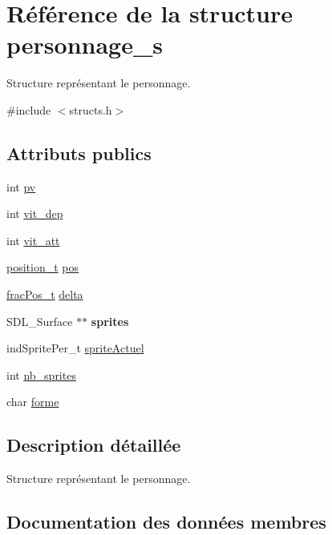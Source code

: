 \hypertarget{structpersonnage__s}{}\section{Référence de la structure personnage\+\_\+s}
\label{structpersonnage__s}


Structure représentant le personnage.  




{\ttfamily \#include $<$structs.\+h$>$}

\subsection*{Attributs publics}
\begin{DoxyCompactItemize}
\item 
int \hyperlink{structpersonnage__s_ab3090d9110756af454516f939e9f8a86}{pv}
\item 
int \hyperlink{structpersonnage__s_a6899a0efdc3a3fccb060aaf06b4e4b8d}{vit\+\_\+dep}
\item 
int \hyperlink{structpersonnage__s_a0022973bab638a02774a19710cedcd17}{vit\+\_\+att}
\item 
\hyperlink{structposition__s}{position\+\_\+t} \hyperlink{structpersonnage__s_adea4789f8b55587ec092f3a32b7b1964}{pos}
\item 
\hyperlink{structfrac_pos__s}{frac\+Pos\+\_\+t} \hyperlink{structpersonnage__s_a396d01ba0660ce2327f65f891d4f239e}{delta}
\item 
\mbox{\label{structpersonnage__s_a8a93d7a1c56bf5d45a13754b8387e27c}} 
S\+D\+L\+\_\+\+Surface $\ast$$\ast$ {\bfseries sprites}
\item 
ind\+Sprite\+Per\+\_\+t \hyperlink{structpersonnage__s_a31cfe3f9dacab7ae783fc557cd0a0adf}{sprite\+Actuel}
\item 
int \hyperlink{structpersonnage__s_aabe3731a1f5bbb6b08c4f9e9d89db0a1}{nb\+\_\+sprites}
\item 
char \hyperlink{structpersonnage__s_a1f1eb200420640259201a84300bccf7e}{forme}
\end{DoxyCompactItemize}


\subsection{Description détaillée}
Structure représentant le personnage. 

\subsection{Documentation des données membres}
\mbox{\label{structpersonnage__s_a396d01ba0660ce2327f65f891d4f239e}} 
